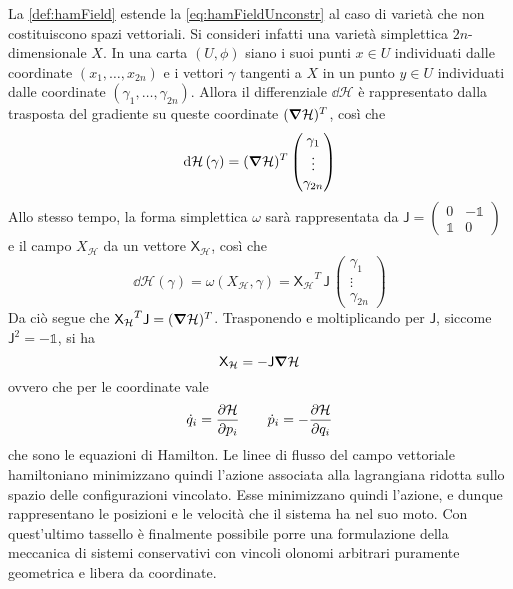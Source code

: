 La \autoref{def:hamField} estende la \autoref{eq:hamFieldUnconstr} al caso di varietà che non costituiscono spazi vettoriali. Si consideri infatti una varietà simplettica $2n$-dimensionale $X$. In una carta $(U,\phi)$ siano i suoi punti $x \in U$ individuati dalle coordinate $(x_1, \ldots, x_{2n})$ e i vettori $\gamma$ tangenti a $X$ in un punto $y \in U$ individuati dalle coordinate $(\gamma_1, \ldots, \gamma_{2n})$. Allora il differenziale $\dd{\mathcal{H}}$ è rappresentato dalla trasposta del gradiente su queste coordinate $(\grad{\mathcal{H}})^T$, così che \begin{equation*}
\dd{\mathcal{H}}(\gamma) = (\grad{\mathcal{H}})^T \begin{pmatrix} \gamma_1\\ \vdots\\ \gamma_{2n} \end{pmatrix}
\end{equation*} 
Allo stesso tempo, la forma simplettica $\omega$ sarà rappresentata da $\mathsf{J} = \left( \begin{smallmatrix}
  0 & -\mathbb{1} \\ \mathbb{1} & 0
\end{smallmatrix}  \right) $ e il campo $X_{\mathcal{H}}$ da un vettore $\mathsf{X_{\mathcal{H}}}$, così che
\begin{equation*}
\dd{\mathcal{H}}(\gamma) = \omega(X_{\mathcal{H}}, \gamma) = \mathsf{X_{\mathcal{H}}}^T\, \mathsf{J}\, \begin{pmatrix} \gamma_1\\ \vdots\\ \gamma_{2n} \end{pmatrix}
\end{equation*} 
Da ciò segue che $\mathsf{X_{\mathcal{H}}}^T \mathsf{J} = (\grad{\mathcal{H}})^T$. Trasponendo e moltiplicando per $\mathsf{J}$, siccome $\mathsf{J}^2 =- \mathbb{1}$, si ha
\begin{equation*}
\mathsf{X}_{\mathcal{H}} = -\mathsf{J} \grad{\mathcal{H}} 
\end{equation*}
ovvero che per le coordinate vale \begin{equation*}
\dot{q}_i = \pdv{\mathcal{H}}{p_i} \qquad \dot{p}_i = - \pdv{\mathcal{H}}{q_i}
\end{equation*}
che sono le equazioni di Hamilton. Le linee di flusso del campo vettoriale hamiltoniano minimizzano quindi l'azione associata alla lagrangiana ridotta sullo spazio delle configurazioni vincolato. Esse minimizzano quindi l'azione, e dunque rappresentano le posizioni e le velocità che il sistema ha nel suo moto. Con quest'ultimo tassello è finalmente possibile porre una formulazione della meccanica di sistemi conservativi con vincoli olonomi arbitrari puramente geometrica e libera da coordinate.


